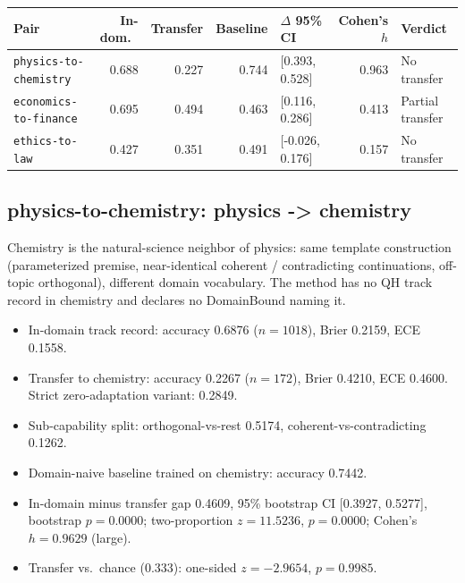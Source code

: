 \documentclass[11pt]{article}
\begin{document}
\begin{longtable}{l r r r l r l}

\toprule

Pair & In-dom.\ & Transfer & Baseline & $\Delta$ 95\% CI & Cohen's $h$ & Verdict \\

\midrule\endhead

\texttt{physics-to-chemistry} & 0.688 & 0.227 & 0.744 & [0.393, 0.528] & 0.963 & No transfer \\

\texttt{economics-to-finance} & 0.695 & 0.494 & 0.463 & [0.116, 0.286] & 0.413 & Partial transfer \\

\texttt{ethics-to-law} & 0.427 & 0.351 & 0.491 & [-0.026, 0.176] & 0.157 & No transfer \\

\bottomrule

\end{longtable}

\subsection{physics-to-chemistry: physics -> chemistry}

Chemistry is the natural-science neighbor of physics: same template construction (parameterized premise, near-identical coherent / contradicting continuations, off-topic orthogonal), different domain vocabulary. The method has no QH track record in chemistry and declares no DomainBound naming it.

\begin{itemize}

\item In-domain track record: accuracy 0.6876 ($n=1018$), Brier 0.2159, ECE 0.1558.

\item Transfer to chemistry: accuracy 0.2267 ($n=172$), Brier 0.4210, ECE 0.4600. Strict zero-adaptation variant: 0.2849.

\item Sub-capability split: orthogonal-vs-rest 0.5174, coherent-vs-contradicting 0.1262.

\item Domain-naive baseline trained on chemistry: accuracy 0.7442.

\item In-domain minus transfer gap 0.4609, 95\% bootstrap CI [0.3927, 0.5277], bootstrap $p=0.0000$; two-proportion $z=11.5236$, $p=0.0000$; Cohen's $h=0.9629$ (large).

\item Transfer vs.\ chance (0.333): one-sided $z=-2.9654$, $p=0.9985$.

\end{itemize}
\end{document}
